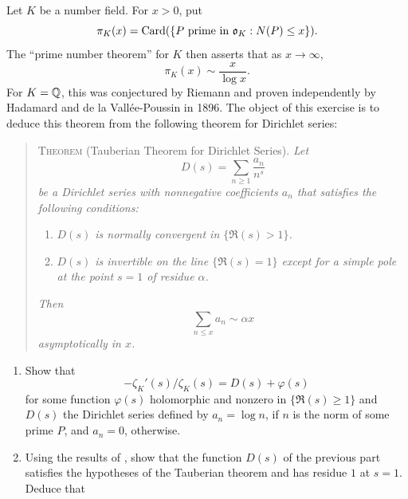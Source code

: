\begin{exercise}[23]
  \label{ex:ch7-23}
  Let $K$ be a number field. For $x > 0$, put
  \[
    \pi_K(x) = \operatorname{Card}(\{P \text{ prime in } \mathfrak{o}_K :
    N(P) \le x\}).
  \]
  The ``prime number theorem'' for $K$ then asserts that as $x \to \infty$,
  \begin{equation}
    \pi_K(x) \sim \frac{x}{\log x}. \tag{7.21} \label{eq:ch7-7.21}
  \end{equation}
  For $K = \mathbb{Q}$, this was conjectured by Riemann and proven independently by
  Hadamard and de la Vall\'ee-Poussin in 1896. The object of this exercise is
  to deduce this theorem from the following theorem for Dirichlet series:
  \begin{quote}
    \textsc{Theorem} (Tauberian Theorem for Dirichlet Series). \emph{Let}
    \[
      D(s) = \sum_{n \ge 1} \frac{a_n}{n^s}
    \]
    \emph{be a Dirichlet series with nonnegative coefficients $a_n$ that
    satisfies the following conditions:}
    \begin{enumerate}[label=(\roman*)]
      \item \emph{$D(s)$ is normally convergent in $\{\Re(s) > 1\}$.}
      \item \emph{$D(s)$ is invertible on the line $\{\Re(s) = 1\}$ except
        for a simple pole at the point $s = 1$ of residue $\alpha$.}
    \end{enumerate}
    \emph{Then}
    \[
      \sum_{n \le x} a_n \sim \alpha x
    \]
    \emph{asymptotically in $x$.}
  \end{quote}
  \begin{enumerate}[label=(\alph*)]
    \item Show that
      \[
        -\zeta_K'(s)/\zeta_K(s) = D(s) + \varphi(s)
      \]
      for some function $\varphi(s)$ holomorphic and nonzero in
      $\{\Re(s) \ge 1\}$ and $D(s)$ the Dirichlet series defined by
      $a_n = \log n$, if $n$ is the norm of some prime $P$, and $a_n = 0$,
      otherwise.
    \item Using the results of , show that the function
      $D(s)$ of the previous part satisfies the hypotheses of the Tauberian
      theorem and has residue $1$ at $s = 1$. Deduce that

\end{enumerate}
\end{exercise}
